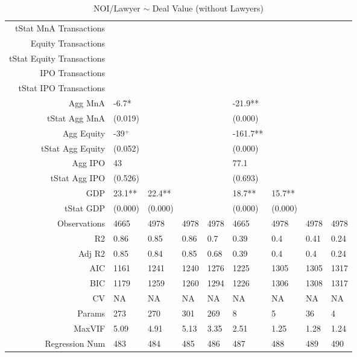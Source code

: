 \begin{table}[ht]
\begin{tabular}{rllllllll}
  tStat MnA Transactions &  &  &  &  &  &  &  &  \\ 
  Equity Transactions &  &  &  &  &  &  &  &  \\ 
  tStat Equity Transactions &  &  &  &  &  &  &  &  \\ 
  IPO Transactions &  &  &  &  &  &  &  &  \\ 
  tStat IPO Transactions &  &  &  &  &  &  &  &  \\ 
  Agg MnA & -6.7* &  &  &  & -21.9** &  &  &  \\ 
  tStat Agg MnA & (0.019) &  &  &  & (0.000) &  &  &  \\ 
  Agg Equity & -39$^{+}$ &  &  &  & -161.7** &  &  &  \\ 
  tStat Agg Equity & (0.052) &  &  &  & (0.000) &  &  &  \\ 
  Agg IPO & 43 &  &  &  & 77.1 &  &  &  \\ 
  tStat Agg IPO & (0.526) &  &  &  & (0.693) &  &  &  \\ 
  GDP & 23.1** & 22.4** &  &  & 18.7** & 15.7** &  &  \\ 
  tStat GDP & (0.000) & (0.000) &  &  & (0.000) & (0.000) &  &  \\ 
  Observations & 4665 & 4978 & 4978 & 4978 & 4665 & 4978 & 4978 & 4978 \\ 
  R2 & 0.86 & 0.85 & 0.86 & 0.7 & 0.39 & 0.4 & 0.41 & 0.24 \\ 
  Adj R2 & 0.85 & 0.84 & 0.85 & 0.68 & 0.39 & 0.4 & 0.4 & 0.24 \\ 
  AIC & 1161 & 1241 & 1240 & 1276 & 1225 & 1305 & 1305 & 1317 \\ 
  BIC & 1179 & 1259 & 1260 & 1294 & 1226 & 1306 & 1308 & 1317 \\ 
  CV & NA & NA & NA & NA & NA & NA & NA & NA \\ 
  Params & 273 & 270 & 301 & 269 & 8 & 5 & 36 & 4 \\ 
  MaxVIF & 5.09 & 4.91 & 5.13 & 3.35 & 2.51 & 1.25 & 1.28 & 1.24 \\ 
  Regression Num & 483 & 484 & 485 & 486 & 487 & 488 & 489 & 490 \\ 
   \hline
\end{tabular}
\caption{NOI/Lawyer $\sim$ Deal Value (without Lawyers)} 
\end{table}
